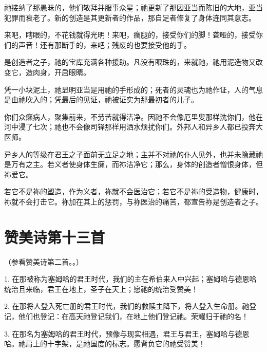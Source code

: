 祂接纳了那愚昧的，他们敬拜并服事众星；祂更新了那因亚当而陈旧的大地，亚当犯罪而衰老了。新的创造是其更新者的作品，那自足者修复了身体连同其意志。\par

来吧，瞎眼的，不花钱就得光明！来吧，瘸腿的，接受你们的脚！聋哑的，接受你们的声音！还有那断手的，来吧；残废的也要接受他的手。\par

是创造者之子，祂的宝库充满各种援助。凡没有眼珠的，来就祂，祂用泥造物又改变它，造肉身，开启眼睛。\par

凭一小块泥土，祂显明亚当是用祂的手形成的；死者的灵魂也为祂作证，人的气息是由祂吹入的；凭最后的见证，祂被证实为那最初者的儿子。\par

你们众癞病人，聚集前来，不劳苦就得洁净。因祂不会像厄里叟那样洗你们，他在河中浸了七次；祂也不会像司铎那样用洒水烦扰你们。外邦人和异乡人都已投奔大医师。\par

异乡人的等级在君王之子面前无立足之地；主并不对祂的仆人见外，也并未隐藏祂是万有之主。若义者使身体生癞，而祢洁净它；那么，身体的创造者憎恨身体，但祢爱它。\par

若它不是祢的塑造，作为义者，祢就不会医治它；若它不是祢的受造物，健康时，祢就不会打击它。祢加在其上的惩罚，与祢医治的痛苦，都宣告祢是创造者之子。\par


\section{赞美诗第十三首}

（参看赞美诗第二首。。）\par

1. 在那被称为塞姆哈的君王时代，我们的主在希伯来人中兴起；塞姆哈与德恩哈统治且来临，君王在地上，圣子在天上；愿祂的统治受赞美！\par

2. 在那将人登入死亡册的君王时代，我们的救赎主降下，将人登入生命册。祂登记，他们也登记：在高天祂登记我们，在地上他们登记祂。荣耀归于祂的名！\par

3. 在那名为塞姆哈的君王时代，预像与现实相遇，君王与君王，塞姆哈与德恩哈。祂肩上的十字架，是祂国度的标志。愿背负它的祂受赞美！\par

